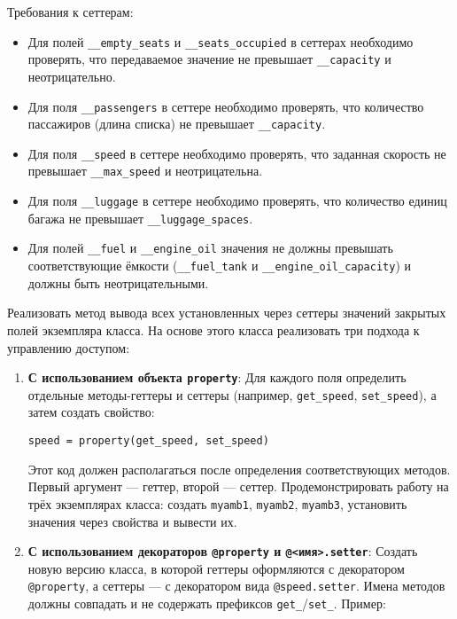 \begin{enumerate}
\begin{itemize}
\end{itemize}
Требования к сеттерам:
\begin{itemize}
    \item Для полей \texttt{\_\_empty\_seats} и \texttt{\_\_seats\_occupied} в сеттерах необходимо проверять, что передаваемое значение не превышает \texttt{\_\_capacity} и неотрицательно.  
    \item Для поля \texttt{\_\_passengers} в сеттере необходимо проверять, что количество пассажиров (длина списка) не превышает \texttt{\_\_capacity}.  
    \item Для поля \texttt{\_\_speed} в сеттере необходимо проверять, что заданная скорость не превышает \texttt{\_\_max\_speed} и неотрицательна.  
    \item Для поля \texttt{\_\_luggage} в сеттере необходимо проверять, что количество единиц багажа не превышает \texttt{\_\_luggage\_spaces}.
    \item Для полей \texttt{\_\_fuel} и \texttt{\_\_engine\_oil} значения не должны превышать соответствующие ёмкости (\texttt{\_\_fuel\_tank} и \texttt{\_\_engine\_oil\_capacity}) и должны быть неотрицательными.
\end{itemize}
Реализовать метод вывода всех установленных через сеттеры значений закрытых полей экземпляра класса.
На основе этого класса реализовать три подхода к управлению доступом:
\begin{enumerate}
    \item \textbf{С использованием объекта \texttt{property}}:  
    Для каждого поля определить отдельные методы-геттеры и сеттеры (например, \texttt{get\_speed}, \texttt{set\_speed}), а затем создать свойство:  
    \begin{verbatim}
speed = property(get_speed, set_speed)
    \end{verbatim}  
    Этот код должен располагаться после определения соответствующих методов. Первый аргумент — геттер, второй — сеттер.  
    Продемонстрировать работу на трёх экземплярах класса: создать \texttt{myamb1}, \texttt{myamb2}, \texttt{myamb3}, установить значения через свойства и вывести их.
    \item \textbf{С использованием декораторов \texttt{@property} и \texttt{@<имя>.setter}}:  
    Создать новую версию класса, в которой геттеры оформляются с декоратором \texttt{@property}, а сеттеры — с декоратором вида \texttt{@speed.setter}. Имена методов должны совпадать и не содержать префиксов \texttt{get\_}/\texttt{set\_}.  
    Пример:  
    \begin{verbatim}

\end{verbatim}
\end{enumerate}
\end{enumerate}
